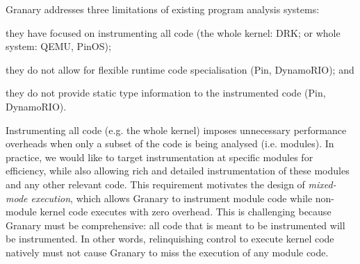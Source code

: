 \documentclass[preprint]{sigplanconf}
\begin{document}

Granary addresses three limitations of existing program analysis systems: \begin{inparaenum}[i)]
	\item they have focused on instrumenting all code (the whole kernel: DRK; or whole system: QEMU, PinOS);
	\item they do not allow for flexible runtime code specialisation (Pin, DynamoRIO); and
	\item they do not provide static type information to the instrumented code (Pin, DynamoRIO).
\end{inparaenum} 


Instrumenting all code (e.g. the whole kernel) imposes unnecessary performance overheads when only a subset of the code is being analysed (i.e. modules). In practice, we would like to target instrumentation at specific modules for efficiency, while also allowing rich and detailed instrumentation of these modules and any other relevant code. This requirement motivates the design of \emph{mixed-mode execution}, which allows Granary to instrument module code while non-module kernel code executes with zero overhead. This is challenging because Granary must be comprehensive: all code that is meant to be instrumented will be instrumented. In other words, relinquishing control to execute kernel code natively must not cause Granary to miss the execution of any module code. %
\end{document}
